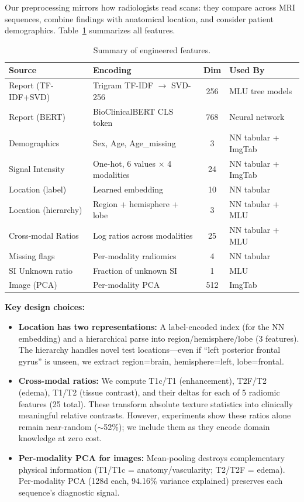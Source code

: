 Our preprocessing mirrors how radiologists read scans: they compare across MRI sequences, combine findings with anatomical location, and consider patient demographics. Table~\ref{tab:feature_summary} summarizes all features.

\begin{table}[H]
\centering
\caption{Summary of engineered features.}
\label{tab:feature_summary}
\begin{tabular}{llcl}
\toprule
\textbf{Source} & \textbf{Encoding} & \textbf{Dim} & \textbf{Used By} \\
\midrule
Report (TF-IDF+SVD) & Trigram TF-IDF $\to$ SVD-256 & 256 & MLU tree models \\
Report (BERT) & BioClinicalBERT CLS token & 768 & Neural network \\
Demographics & Sex, Age, Age\_missing & 3 & NN tabular + ImgTab \\
Signal Intensity & One-hot, 6 values $\times$ 4 modalities & 24 & NN tabular + ImgTab \\
Location (label) & Learned embedding & 10 & NN tabular \\
Location (hierarchy) & Region + hemisphere + lobe & 3 & NN tabular + MLU \\
Cross-modal Ratios & Log ratios across modalities & 25 & NN tabular + MLU \\
Missing flags & Per-modality radiomics & 4 & NN tabular \\
SI Unknown ratio & Fraction of unknown SI & 1 & MLU \\
Image (PCA) & Per-modality PCA & 512 & ImgTab \\
\bottomrule
\end{tabular}
\end{table}

\textbf{Key design choices:}

\begin{itemize}
  \item \textbf{Location has two representations:} A label-encoded index (for the NN embedding) and a hierarchical parse into region/hemisphere/lobe (3 features). The hierarchy handles novel test locations---even if ``left posterior frontal gyrus'' is unseen, we extract region=brain, hemisphere=left, lobe=frontal.
  \item \textbf{Cross-modal ratios:} We compute T1c/T1 (enhancement), T2F/T2 (edema), T1/T2 (tissue contrast), and their deltas for each of 5 radiomic features (25 total). These transform absolute texture statistics into clinically meaningful relative contrasts. However, experiments show these ratios alone remain near-random ($\sim$52\%); we include them as they encode domain knowledge at zero cost.
  \item \textbf{Per-modality PCA for images:} Mean-pooling destroys complementary physical information (T1/T1c = anatomy/vascularity; T2/T2F = edema). Per-modality PCA (128d each, 94.16\% variance explained) preserves each sequence's diagnostic signal.
\end{itemize}

